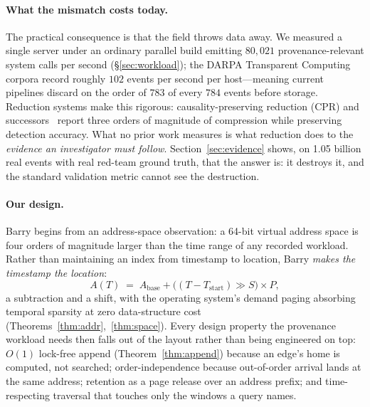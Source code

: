 \documentclass[11pt,letterpaper,twocolumn]{article}
\begin{document}
\paragraph{What the mismatch costs today.}
The practical consequence is that the field throws data away. We
measured a single server under an ordinary parallel build emitting
$80{,}021$ provenance-relevant system calls per second
(\S\ref{sec:workload}); the DARPA Transparent Computing corpora record
roughly $102$ events per second per host---meaning current pipelines
discard on the order of $783$ of every $784$ events before storage.
Reduction systems make this rigorous: causality-preserving reduction
(CPR) and successors~\cite{zhang2025tapas} report three orders of
magnitude of compression while preserving detection accuracy. What no
prior work measures is what reduction does to the \emph{evidence an
investigator must follow}. Section~\ref{sec:evidence} shows, on 1.05
billion real events with real red-team ground truth, that the answer
is: it destroys it, and the standard validation metric cannot see the
destruction.

\paragraph{Our design.}
Barry begins from an address-space observation: a 64-bit virtual
address space is four orders of magnitude larger than the time range
of any recorded workload. Rather than maintaining an index from
timestamp to location, Barry \emph{makes the timestamp the location}:
\begin{equation}
A(T) \;=\; A_{\mathrm{base}} + \big((T - T_{\mathrm{start}}) \gg S\big)\times P,
\label{eq:mapping}
\end{equation}
a subtraction and a shift, with the operating system's demand paging
absorbing temporal sparsity at zero data-structure cost
(Theorems~\ref{thm:addr},~\ref{thm:space}). Every design property the
provenance workload needs then falls out of the layout rather than
being engineered on top: $O(1)$ lock-free append
(Theorem~\ref{thm:append}) because an edge's home is computed, not
searched; order-independence because out-of-order arrival lands at the
same address; retention as a page release over an address prefix; and
time-respecting traversal that touches only the windows a query names.
\end{document}
